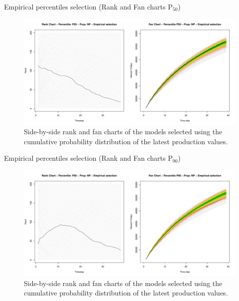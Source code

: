 \documentclass{beamer}
\begin{document}
\begin{frame}{Empirical percentiles selection (Rank and Fan charts P$_{50}$)}
  \begin{figure}[H]
    \centering
    \includegraphics[width=\columnwidth]{rank-fan-ecdf-p50.pdf}
    \caption{Side-by-side rank and fan charts of the models selected using the cumulative probability distribution of the latest production values.}
    \label{fig:rank-fan-ecdf}
  \end{figure}
\end{frame}

\begin{frame}{Empirical percentiles selection (Rank and Fan charts P$_{90}$)}
  \begin{figure}[H]
    \centering
    \includegraphics[width=\columnwidth]{rank-fan-ecdf-p90.pdf}
    \caption{Side-by-side rank and fan charts of the models selected using the cumulative probability distribution of the latest production values.}
    \label{fig:rank-fan-ecdf}
  \end{figure}
\end{frame}
\end{document}
